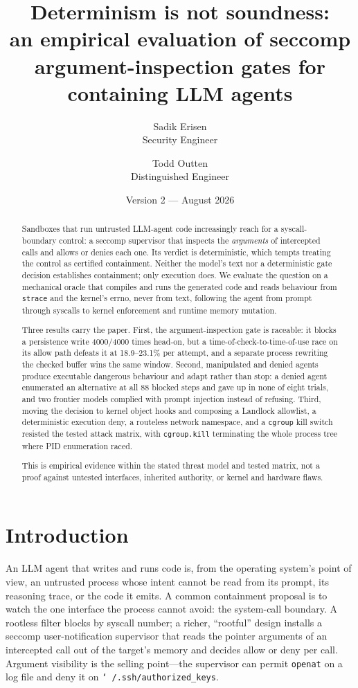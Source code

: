 \documentclass[11pt]{article}
\title{Determinism is not soundness:\\
an empirical evaluation of seccomp argument-inspection gates
for containing LLM agents}
\author{Sadik Erisen\\[2pt]
\normalsize Security Engineer
\and
Todd Outten\\[2pt]
\normalsize Distinguished Engineer}
\date{Version 2 --- August 2026}
\newcommand{\Nrace}{4000}
\newcommand{\RaceLo}{18.9}
\newcommand{\RaceHi}{23.1}
\begin{document}
\maketitle

\begin{abstract}
Sandboxes that run untrusted LLM-agent code increasingly reach for a syscall-boundary control: a seccomp
supervisor that inspects the \emph{arguments} of intercepted calls and allows or denies each one. Its
verdict is deterministic, which tempts treating the control as certified containment. Neither the model's
text nor a deterministic gate decision establishes containment; only execution does. We evaluate the
question on a mechanical oracle that compiles and runs the generated code and reads behaviour from
\texttt{strace} and the kernel's errno, never from text, following the agent from prompt through syscalls
to kernel enforcement and runtime memory mutation.

Three results carry the paper. First, the argument-inspection gate is raceable: it blocks a persistence
write \Nrace/\Nrace{} times head-on, but a time-of-check-to-time-of-use race on its allow path defeats it
at \RaceLo--\RaceHi\% per attempt, and a separate process rewriting the checked buffer wins the same
window. Second, manipulated and denied agents produce executable dangerous behaviour and adapt rather than
stop: a denied agent enumerated an alternative at all 88 blocked steps and gave up in none of eight
trials, and two frontier models complied with prompt injection instead of refusing. Third, moving the
decision to kernel object hooks and composing a Landlock allowlist, a deterministic execution deny, a
routeless network namespace, and a \texttt{cgroup} kill switch resisted the tested attack matrix, with
\texttt{cgroup.kill} terminating the whole process tree where PID enumeration raced.

This is empirical evidence within the stated threat model and tested matrix, not a proof against untested
interfaces, inherited authority, or kernel and hardware flaws.
\end{abstract}

\section{Introduction}

An LLM agent that writes and runs code is, from the operating system's point of view, an
untrusted process whose intent cannot be read from its prompt, its reasoning trace, or the
code it emits. A common containment proposal is to watch the one interface the process
cannot avoid: the system-call boundary. A rootless filter blocks by syscall number; a
richer, ``rootful'' design installs a seccomp user-notification supervisor that reads the
pointer arguments of an intercepted call out of the target's memory and decides allow or
deny per call. Argument visibility is the selling point---the supervisor can permit
\texttt{openat} on a log file and deny it on \texttt{\char`~/.ssh/authorized\_keys}.
\end{document}
